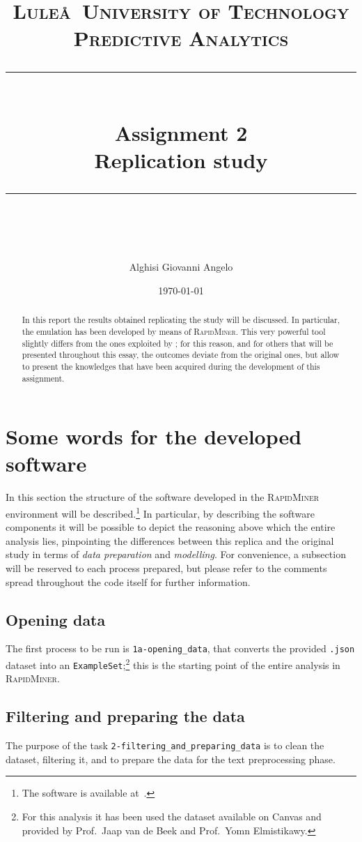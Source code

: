 \documentclass[a4paper]{article}
\title{
	\large 
	\textsc{Lule\aa~University of Technology\\[5pt] 
		Predictive Analytics} \\[10pt]
	\rule{\linewidth}{0.5pt}\\
	\vspace{0.3cm}
	\Large Assignment 2\\
	\vspace{0.3cm}
	\huge \bf Replication study\normalsize
	\vspace{0.3cm}
	\rule{\linewidth}{0.5pt}  \\
}
\author{Alghisi Giovanni Angelo}
\date{\normalsize \today}
\begin{document}
	
	\renewcommand{\tableautorefname}{Tab.} %
	\renewcommand{\figureautorefname}{Tab.} %
	
	\maketitle
	
	\begin{abstract}
		In this report the results obtained replicating the study \cite{article:muller} will be discussed. In particular, the emulation has been developed by means of \textsc{RapidMiner}. This very powerful tool slightly differs from the ones exploited by \citeauthor{article:muller}; for this reason, and for others that will be presented throughout this essay, the outcomes deviate from the original ones, but allow to present the knowledges that have been acquired during the development of this assignment. 
	\end{abstract}
	
	\tableofcontents
	
	
	\section{Some words for the developed software}
		In this section the structure of the software developed in the \textsc{RapidMiner} environment will be described.\footnote{The software is available at~\cite{repo:pa-assignment-2}.} In particular, by describing the software components it will be possible to depict the reasoning above which the entire analysis lies, pinpointing the differences between this replica and the original study in terms of \emph{data preparation} and \emph{modelling}. For convenience, a subsection will be reserved to each process prepared, but please refer to the comments spread throughout the code itself for further information.
		
		\subsection{Opening data}
		 	The first process to be run is \verb|1a-opening_data|, that converts the provided \verb|.json| dataset into an \verb|ExampleSet|;\footnote{For this analysis it has been used the dataset available on Canvas and provided by Prof.~Jaap van de Beek and Prof.~Yomn Elmistikawy.} this is the starting point of the entire analysis in \textsc{RapidMiner}.
		 
		 \subsection{Filtering and preparing the data}
		 	The purpose of the task \verb*|2-filtering_and_preparing_data| is to clean the dataset, filtering it, and to prepare the data for the text preprocessing phase.
		 	
\end{document}
